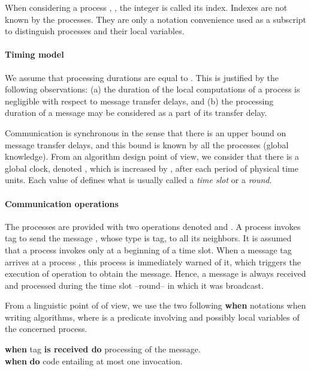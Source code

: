\documentclass[11pt,english]{article}
\begin{document}
When considering a process , , the integer  
is called its index. Indexes are not known by the processes. 
They are only a notation convenience used as a subscript 
to distinguish processes and their local variables. 


\paragraph{Timing model}
We assume that processing durations are equal to . This is
justified by the following observations: (a) the duration of the local
computations of a process is negligible with respect to message
transfer delays, and (b) the processing duration of a message may be
considered as a part of its transfer delay.

Communication is synchronous in the sense that there is an upper bound
 on message transfer delays, and this bound is known by all the
processes (global knowledge). From an algorithm design point of view,
we consider that there is a global clock, denoted , which is
increased by , after each period of  physical time units. 
Each value of  defines what is usually called a {\it time slot}
or a {\it round}.



\paragraph{Communication operations}
The processes are provided with two operations denoted  and .  A process  invokes  {\sc tag} to send the message , whose type is
{\sc tag}, to all its neighbors.  It is assumed that a process invokes
 only at a beginning of a time slot.  When a
message {\sc tag} arrives at a process , this process is
immediately warned of it, which triggers the execution of operation
 to obtain the message. Hence, a message is always
received and processed during the time slot --round-- in which it was
broadcast.

From a linguistic point of of view, we use the two following
{\bf when} notations when writing algorithms, where  
is a predicate involving  and possibly local variables of the
concerned process.  
\begin{tabbing} 

{\bf  when} {\sc  tag} {\bf  is received do} processing of the message. \\

{\bf  when}  
                         {\bf do} code entailing at most one 
invocation. 
\end{tabbing}
\end{document}
